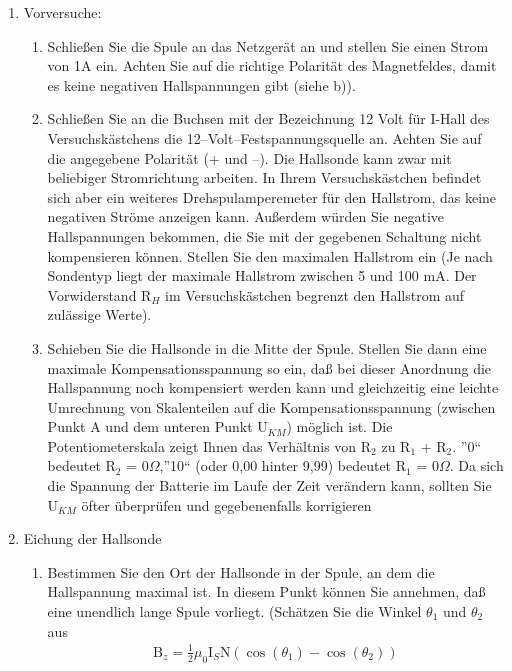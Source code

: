 \documentclass[12pt]{scrartcl}
\begin{document}
\begin{enumerate}
\item
Vorversuche: \newline
\begin{enumerate}
\item
Schließen Sie die Spule an das Netzgerät an und stellen Sie einen Strom von 1A ein. Achten Sie auf die richtige Polarität des Magnetfeldes, damit es keine negativen Hallspannungen gibt (siehe b)).
\newline
\item
Schließen Sie an die Buchsen mit der Bezeichnung 12 Volt für I-Hall des Versuchskästchens die 12–Volt–Festspannungsquelle an. Achten Sie auf die angegebene Polarität (+ und –). Die Hallsonde kann zwar mit beliebiger Stromrichtung arbeiten. In Ihrem Versuchskästchen befindet sich aber ein weiteres Drehspulamperemeter für den Hallstrom, das keine negativen Ströme anzeigen kann. Außerdem würden Sie negative Hallspannungen bekommen, die
Sie mit der gegebenen Schaltung nicht kompensieren können. Stellen Sie den
maximalen Hallstrom ein (Je nach
Sondentyp liegt der maximale Hallstrom zwischen 5 und 100 mA. Der Vorwiderstand
R$_H$ im Versuchskästchen begrenzt den Hallstrom auf zulässige Werte).
\newline
\item
Schieben Sie die Hallsonde in die Mitte der Spule. Stellen Sie dann eine maximale Kompensationsspannung so ein, daß bei dieser Anordnung die Hallspannung noch kompensiert werden kann und gleichzeitig eine leichte Umrechnung von Skalenteilen auf die Kompensationsspannung (zwischen Punkt A und dem unteren Punkt U$_{KM}$) möglich ist. Die Potentiometerskala zeigt Ihnen das Verhältnis von R$_2$ zu R$_1$ + R$_2$.
”0“ bedeutet R$_2$ = 0$\Omega$,”10“ (oder
0,00 hinter 9,99) bedeutet R$_1$ = 0$\Omega$. Da sich die Spannung der Batterie im Laufe der Zeit verändern kann, sollten Sie U$_{KM}$ öfter überprüfen und gegebenenfalls korrigieren
\end{enumerate}
\item
Eichung der Hallsonde 
\newline
\begin{enumerate}
\item
Bestimmen Sie den Ort der Hallsonde in der Spule, an dem die Hallspannung maximal ist. In diesem Punkt können Sie annehmen, daß eine unendlich lange
Spule vorliegt. (Schätzen Sie die Winkel
$\theta_1$ und $\theta_2$ aus 
\begin{align}
\text{B}_z = \frac{1}{2} \mu_0 \text{I}_S \text{N} (\cos(\theta_1) - \cos(\theta_2))
\label{eqn:Aufgabe 3_PD_B-Feld_1} 
\end{align}


\end{enumerate}
\end{enumerate}
\end{document}
